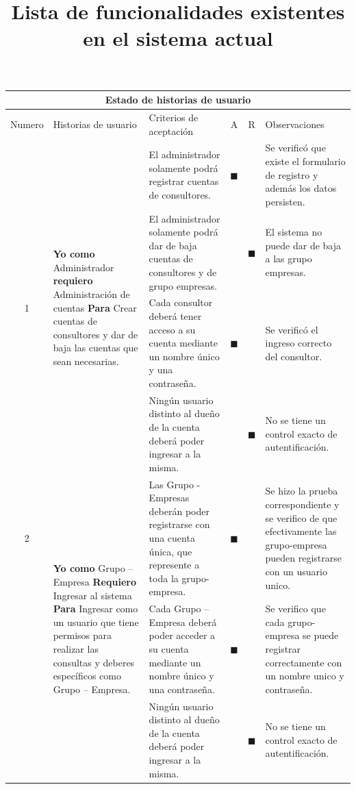 \documentclass[letterpaper,11pt]{article}
\title{Lista de funcionalidades existentes en el sistema actual}
\begin{document}
	\maketitle
	\begin{landscape}
		\begin{tabular}{|c|p{5cm}|p{7.5cm}|c|c|p{7.5cm}|}
			\hline
			\multicolumn{6}{|c|}{Estado de historias de usuario} \\ \hline
			Numero  &  Historias de usuario & Criterios de aceptación & A & R & Observaciones \\ \hline
			\multirow{4}{*}{1} & \multirow{4}{5cm}{\textbf{Yo como} Administrador \textbf{requiero} Administración de cuentas \textbf{Para} Crear cuentas de consultores y dar de baja las cuentas que sean necesarias.} & El administrador solamente podrá registrar cuentas de consultores. & $\blacksquare$ & & Se verificó que existe el formulario de registro y además los datos persisten. \\ \cline{3-6}
			& & El administrador solamente podrá dar de baja cuentas de consultores y de grupo empresas. & &$\blacksquare$ & El sistema no puede dar de baja a las grupo empresas. \\ \cline{3-6}
			& & Cada consultor deberá tener acceso a su cuenta mediante un nombre único y una contraseña. & $\blacksquare$ & & Se verificó el ingreso correcto del consultor. \\ \cline{3-6}
			& & Ningún usuario distinto al  dueño de la cuenta deberá poder ingresar a la misma. &  & $\blacksquare$ &  No se tiene un control exacto de autentificación. \\ \hline
			2 & \multirow{3}{5cm}{\textbf{Yo como} Grupo – Empresa \textbf{Requiero} Ingresar al sistema \textbf{Para} Ingresar como un usuario que tiene permisos para realizar las consultas y deberes específicos como Grupo – Empresa. } & Las Grupo - Empresas deberán poder registrarse con una cuenta única, que represente a toda la grupo-empresa. & $\blacksquare$ & & Se hizo la prueba correspondiente y se verifico de que efectivamente las grupo-empresa pueden registrarse con un usuario unico. \\ \cline{3-6}
			& & Cada Grupo – Empresa deberá poder acceder a su cuenta mediante un nombre único y una contraseña. & $\blacksquare$ & & Se verifico que cada grupo-empresa se puede registrar correctamente con un nombre unico y contraseña. \\ \cline{3-6}
			& & Ningún usuario distinto al dueño de la cuenta deberá poder ingresar a la misma. & & $\blacksquare$ & No se tiene un control exacto de autentificación. \\ \hline

\end{tabular}
\end{landscape}
\end{document}
